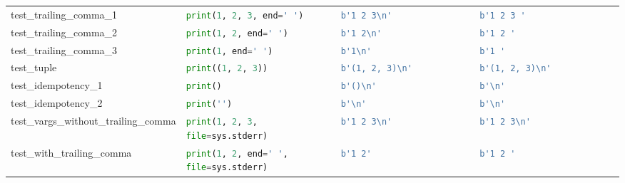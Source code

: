 \begin{table}[ht]
\begin{tabular}{@{}l|llll@{}}
    test\_trailing\_comma\_1              & \lstinline[language=Python, style=pythonstyle]|print(1, 2, 3, end=' ')              | & \lstinline[language=Python, style=pythonstyle]|b'1 2 3\n'             | & \lstinline[language=Python, style=pythonstyle]|b'1 2 3 '                             | \\ 
    test\_trailing\_comma\_2              & \lstinline[language=Python, style=pythonstyle]|print(1, 2, end=' ')                 | & \lstinline[language=Python, style=pythonstyle]|b'1 2\n'               | & \lstinline[language=Python, style=pythonstyle]|b'1 2 '                               | \\ 
    test\_trailing\_comma\_3              & \lstinline[language=Python, style=pythonstyle]|print(1, end=' ')                    | & \lstinline[language=Python, style=pythonstyle]|b'1\n'                 | & \lstinline[language=Python, style=pythonstyle]|b'1 '                                 | \\ 
    test\_tuple                           & \lstinline[language=Python, style=pythonstyle]|print((1, 2, 3))                     | & \lstinline[language=Python, style=pythonstyle]|b'(1, 2, 3)\n'         | & \lstinline[language=Python, style=pythonstyle]|b'(1, 2, 3)\n'         | \\ 
    test\_idempotency\_1                  & \lstinline[language=Python, style=pythonstyle]|print()                              | & \lstinline[language=Python, style=pythonstyle]|b'()\n'                | & \lstinline[language=Python, style=pythonstyle]|b'\n'                  | \\ 
    test\_idempotency\_2                  & \lstinline[language=Python, style=pythonstyle]|print('')                            | & \lstinline[language=Python, style=pythonstyle]|b'\n'                  | & \lstinline[language=Python, style=pythonstyle]|b'\n'                  | \\ 
    test\_vargs\_without\_trailing\_comma & \lstinline[language=Python, style=pythonstyle]|print(1, 2, 3, file=sys.stderr)      | & \lstinline[language=Python, style=pythonstyle]|b'1 2 3\n'             | & \lstinline[language=Python, style=pythonstyle]|b'1 2 3\n'             | \\ 
    test\_with\_trailing\_comma           & \lstinline[language=Python, style=pythonstyle]|print(1, 2, end=' ', file=sys.stderr)| & \lstinline[language=Python, style=pythonstyle]|b'1 2'                                | & \lstinline[language=Python, style=pythonstyle]|b'1 2 '                               | \\ 

\end{tabular}
\end{table}
